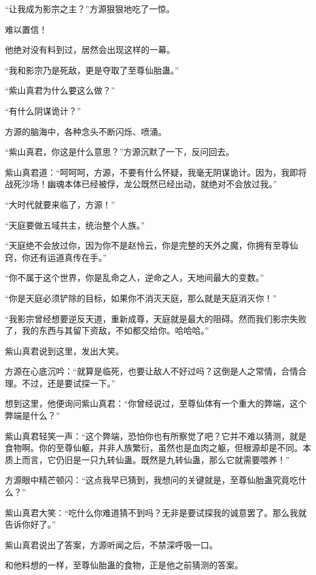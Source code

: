 
\begin{this_body}

“让我成为影宗之主？”方源狠狠地吃了一惊。

难以置信！

他绝对没有料到过，居然会出现这样的一幕。

“我和影宗乃是死敌，更是夺取了至尊仙胎蛊。”

“紫山真君为什么要这么做？”

“有什么阴谋诡计？”

方源的脑海中，各种念头不断闪烁、喷涌。

“紫山真君，你这是什么意思？”方源沉默了一下，反问回去。

紫山真君道：“呵呵呵，方源，不要有什么怀疑，我毫无阴谋诡计。因为，我即将战死沙场！幽魂本体已经被俘，龙公既然已经出动，就绝对不会放过我。”

“大时代就要来临了，方源！”

“天庭要做五域共主，统治整个人族。”

“天庭绝不会放过你，因为你不是赵怜云，你是完整的天外之魔，你拥有至尊仙窍，你还有运道真传在手。”

“你不属于这个世界，你是乱命之人，逆命之人，天地间最大的变数。”

“你是天庭必须铲除的目标，如果你不消灭天庭，那么就是天庭消灭你！”

“我影宗曾经想要逆反天道，重新成尊，天庭就是最大的阻碍。然而我们影宗失败了，我的东西与其留下资敌，不如都交给你。哈哈哈。”

紫山真君说到这里，发出大笑。

方源在心底沉吟：“就算是临死，也要让敌人不好过吗？这倒是人之常情，合情合理。不过，还是要试探一下。”

想到这里，他便询问紫山真君：“你曾经说过，至尊仙体有一个重大的弊端，这个弊端是什么？”

紫山真君轻笑一声：“这个弊端，恐怕你也有所察觉了吧？它并不难以猜测，就是食物啊。你的至尊仙躯，并非人族繁衍，虽然也是血肉之躯，但根源却是不同。本质上而言，它仍旧是一只九转仙蛊。既然是九转仙蛊，那么它就需要喂养！”

方源眼中精芒顿闪：“这点我早已猜到，我想问的关键就是，至尊仙胎蛊究竟吃什么？”

紫山真君大笑：“吃什么你难道猜不到吗？无非是要试探我的诚意罢了。那么我就告诉你好了。”

紫山真君说出了答案，方源听闻之后，不禁深呼吸一口。

和他料想的一样，至尊仙胎蛊的食物，正是他之前猜测的答案。


\end{this_body}
